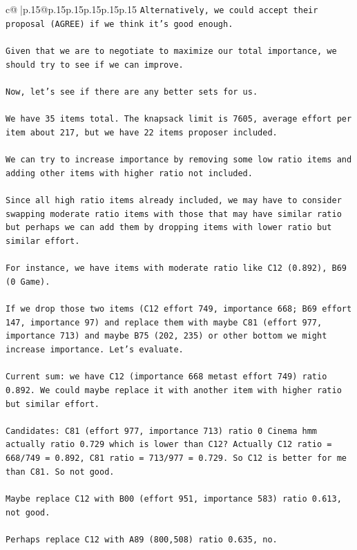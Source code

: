 \documentclass{article}
\begin{document}
{\begin{supertabular}{c@{$\;$}|p{.15\linewidth}@{}p{.15\linewidth}p{.15\linewidth}p{.15\linewidth}p{.15\linewidth}p{.15\linewidth}}
{{{\texttt{Alternatively, we could accept their proposal (AGREE) if we think it's good enough.} \\
\\ 
\texttt{Given that we are to negotiate to maximize our total importance, we should try to see if we can improve.} \\
\\ 
\texttt{Now, let's see if there are any better sets for us.} \\
\\ 
\texttt{We have 35 items total. The knapsack limit is 7605, average effort per item about 217, but we have 22 items proposer included.} \\
\\ 
\texttt{We can try to increase importance by removing some low ratio items and adding other items with higher ratio not included.} \\
\\ 
\texttt{Since all high ratio items already included, we may have to consider swapping moderate ratio items with those that may have similar ratio but perhaps we can add them by dropping items with lower ratio but similar effort.} \\
\\ 
\texttt{For instance, we have items with moderate ratio like C12 (0.892), B69 (0 Game).} \\
\\ 
\texttt{If we drop those two items (C12 effort 749, importance 668; B69 effort 147, importance 97) and replace them with maybe C81 (effort 977, importance 713) and maybe B75 (202, 235) or other	bottom we might increase importance. Let's evaluate.} \\
\\ 
\texttt{Current sum: we have C12 (importance 668 metast effort 749) ratio 0.892. We could maybe replace it with another item with higher ratio but similar effort.} \\
\\ 
\texttt{Candidates: C81 (effort 977, importance 713) ratio 0 Cinema hmm actually ratio 0.729 which is lower than C12? Actually C12 ratio = 668/749 = 0.892, C81 ratio = 713/977 = 0.729. So C12 is better for me than C81. So not good.} \\
\\ 
\texttt{Maybe replace C12 with B00 (effort 951, importance 583) ratio 0.613, not good.} \\
\\ 
\texttt{Perhaps replace C12 with A89 (800,508) ratio 0.635, no.} \\
}}}
\end{supertabular}}
\end{document}
